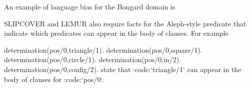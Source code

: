 \documentclass[letterpaper,10pt,english]{sphinxmanual}
\begin{document}
An example of language bias for the Bongard domain is

\begin{sphinxVerbatim}[commandchars=\\\{\}]


\end{sphinxVerbatim}

SLIPCOVER and LEMUR also require facts for the  Aleph-style predicate that indicate which predicates can appear in the body of clauses.
For example

\begin{sphinxVerbatim}[commandchars=\\\{\}]
determination(pos/0,triangle/1).
determination(pos/0,square/1).
determination(pos/0,circle/1).
determination(pos/0,in/2).
determination(pos/0,config/2).
state that :code:{}`triangle/1{}` can appear in the body of clauses for :code:{}`pos/0{}`.
\end{sphinxVerbatim}
\end{document}
